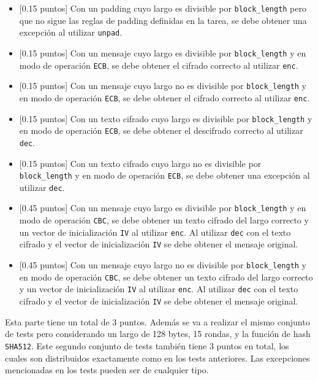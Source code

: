 \begin{itemize}
\item{[0.15 puntos]} Con un padding cuyo largo es divisible por \texttt{block\_length} pero que no sigue las reglas de padding definidas en la tarea, se debe obtener una excepción al utilizar \texttt{unpad}.

\item{[0.15 puntos]} Con un mensaje cuyo largo es divisible por \texttt{block\_length} y en modo de operación \texttt{ECB}, se debe obtener el cifrado correcto al utilizar \texttt{enc}.

\item{[0.15 puntos]} Con un mensaje cuyo largo no es divisible por \texttt{block\_length} y en modo de operación \texttt{ECB}, se debe obtener el cifrado correcto al utilizar \texttt{enc}.

\item{[0.15 puntos]} Con un texto cifrado cuyo largo es divisible por \texttt{block\_length} y en modo de operación \texttt{ECB}, se debe obtener el descifrado correcto al utilizar \texttt{dec}.

\item{[0.15 puntos]} Con un texto cifrado cuyo largo no es divisible por \texttt{block\_length} y en modo de operación \texttt{ECB}, se debe obtener una excepción al utilizar \texttt{dec}.

\item{[0.45 puntos]} Con un mensaje cuyo largo es divisible por \texttt{block\_length} y en modo de operación \texttt{CBC}, se debe obtener un texto cifrado del largo correcto y un vector de inicialización \texttt{IV} al utilizar \texttt{enc}. Al utilizar \texttt{dec} con el texto cifrado y el vector de inicialización \texttt{IV} se debe obtener el mensaje original.

\item{[0.45 puntos]} Con un mensaje cuyo largo no es divisible por \texttt{block\_length} y en modo de operación \texttt{CBC}, se debe obtener un texto cifrado del largo correcto y un vector de inicialización \texttt{IV} al utilizar \texttt{enc}. Al utilizar \texttt{dec} con el texto cifrado y el vector de inicialización \texttt{IV} se debe obtener el mensaje original.
\end{itemize}
Esta parte tiene un total de 3 puntos. Además se va a realizar el mismo conjunto de tests pero considerando un largo de 128 bytes, 15 rondas, y la función de hash \texttt{SHA512}. Este segundo conjunto de tests también tiene 3 puntos en total, los cuales son distribuidos exactamente como en los tests anteriores. Las excepciones mencionadas en los tests pueden ser de cualquier tipo.
